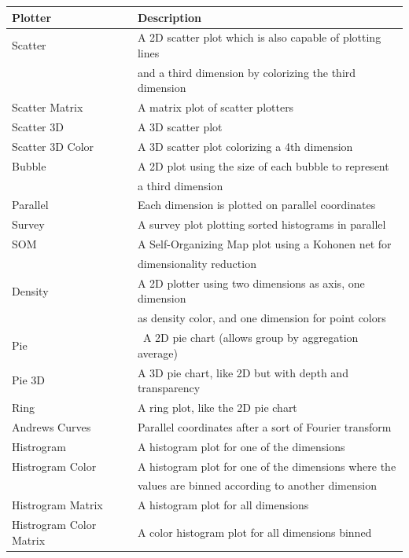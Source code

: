 \documentclass[11pt]{article}
\begin{document}
\begin{table}[htbp]
  \begin{tabular}{|l|l|}
    \hline
    \textbf{Plotter} & \textbf{Description} \\
    \hline
    Scatter           & A 2D scatter plot which is also capable of plotting lines \\
                      & and a third dimension by colorizing the third dimension \\
    Scatter Matrix    & A matrix plot of scatter plotters \\
    Scatter 3D        & A 3D scatter plot \\
    Scatter 3D Color  & A 3D scatter plot colorizing a 4th dimension \\
    Bubble            & A 2D plot using the size of each bubble to represent \\
                      & a third dimension \\
    Parallel          & Each dimension is plotted on parallel coordinates \\
    Survey            & A survey plot plotting sorted histograms in parallel \\
    SOM               & A Self-Organizing Map plot using a Kohonen net for \\
                      &  dimensionality reduction \\
    Density           & A 2D plotter using two dimensions as axis, one dimension \\
                      &  as density color, and one dimension for point colors \\
    Pie               & A 2D pie chart (allows group by aggregation average) \\
    Pie 3D            & A 3D pie chart, like 2D but with depth and transparency \\
    Ring              & A ring plot, like the 2D pie chart \\
    Andrews Curves    & Parallel coordinates after a sort of Fourier transform \\
    Histrogram        & A histogram plot for one of the dimensions \\
    Histrogram Color  & A histogram plot for one of the dimensions where the \\
                      & values are binned according to another dimension \\
    Histrogram Matrix & A histogram plot for all dimensions \\
    Histrogram Color Matrix & A color histogram plot for all dimensions binned \\

\end{tabular}
\end{table}
\end{document}

